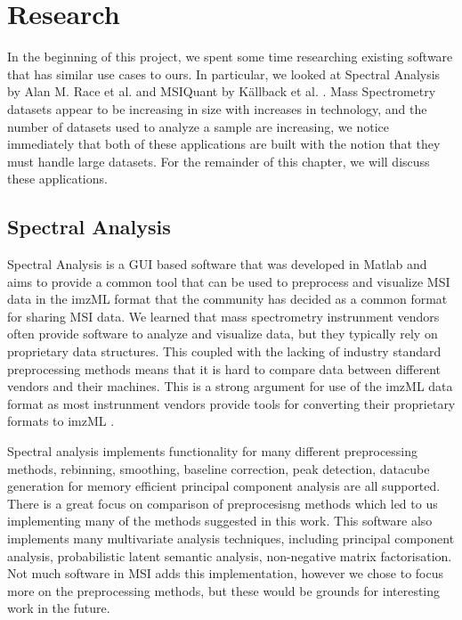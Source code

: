 \documentclass[11pt,openany]{book}
\begin{document}
\chapter{Research}
\label{chapter:Research}
In the beginning of this project, we spent some time researching existing software that has similar use cases to ours. In particular, we looked at Spectral Analysis by Alan M. Race et al. \cite{spectral_analysis_article} and MSIQuant by K{\"a}llback et al. \cite{MSI_QUANT_Article}. Mass Spectrometry datasets appear to be increasing in size with increases in technology, and the number of datasets used to analyze a sample are increasing, we notice immediately that both of these applications are built with the notion that they must handle large datasets. For the remainder of this chapter, we will discuss these applications.

\section{Spectral Analysis}
Spectral Analysis is a GUI based software that was developed in Matlab and aims to provide a common tool that can be used to preprocess and visualize MSI data in the imzML format that the community has decided as a common format for sharing MSI data. We learned that mass spectrometry instrunment vendors often provide software to analyze and visualize data, but they typically rely on proprietary data structures. This coupled with the lacking of industry standard preprocessing methods means that it is hard to compare data between different vendors and their machines. This is a strong argument for use of the imzML data format as most instrunment vendors provide tools for converting their proprietary formats to imzML \cite{spectral_analysis_article}.

Spectral analysis implements functionality for many different preprocessing methods, rebinning, smoothing, baseline correction, peak detection, datacube generation for memory efficient principal component analysis are all supported. There is a great focus on comparison of preprocesisng methods which led to us implementing many of the methods suggested in this work. This software also implements many multivariate analysis techniques, including principal component analysis, probabilistic latent semantic analysis, non-negative matrix factorisation. Not much software in MSI adds this implementation, however we chose to focus more on the preprocessing methods, but these would be grounds for interesting work in the future.
\end{document}
